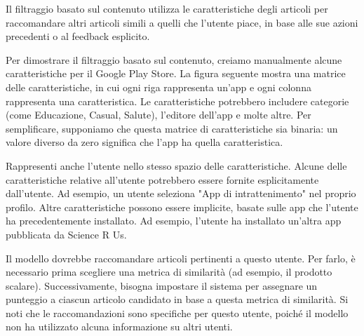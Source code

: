 \documentclass{article}
\begin{document}
Il filtraggio basato sul contenuto utilizza le caratteristiche degli articoli per raccomandare altri articoli simili a quelli che l'utente piace, in base alle sue azioni precedenti o al feedback esplicito.

Per dimostrare il filtraggio basato sul contenuto, creiamo manualmente alcune caratteristiche per il Google Play Store. La figura seguente mostra una matrice delle caratteristiche, in cui ogni riga rappresenta un'app e ogni colonna rappresenta una caratteristica. Le caratteristiche potrebbero includere categorie (come Educazione, Casual, Salute), l'editore dell'app e molte altre. Per semplificare, supponiamo che questa matrice di caratteristiche sia binaria: un valore diverso da zero significa che l'app ha quella caratteristica.

Rappresenti anche l'utente nello stesso spazio delle caratteristiche. Alcune delle caratteristiche relative all'utente potrebbero essere fornite esplicitamente dall'utente. Ad esempio, un utente seleziona "App di intrattenimento" nel proprio profilo. Altre caratteristiche possono essere implicite, basate sulle app che l'utente ha precedentemente installato. Ad esempio, l'utente ha installato un'altra app pubblicata da Science R Us.

Il modello dovrebbe raccomandare articoli pertinenti a questo utente. Per farlo, è necessario prima scegliere una metrica di similarità (ad esempio, il prodotto scalare). Successivamente, bisogna impostare il sistema per assegnare un punteggio a ciascun articolo candidato in base a questa metrica di similarità. Si noti che le raccomandazioni sono specifiche per questo utente, poiché il modello non ha utilizzato alcuna informazione su altri utenti.






\end{document}

